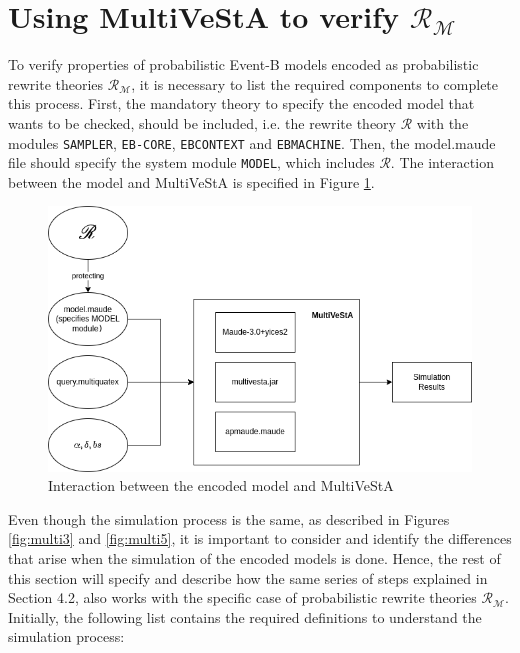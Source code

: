 \section{Using MultiVeStA to verify $\mathscr{R}_\mathscr{M}$}

To verify properties of probabilistic Event-B models encoded as probabilistic rewrite theories $\mathscr{R}_\mathscr{M}$, it is necessary to list the required components to complete this process. First, the mandatory theory to specify the encoded model that wants to be checked, should be included, i.e. the rewrite theory $\mathscr{R}$ with the modules \texttt{SAMPLER}, \texttt{EB-CORE}, \texttt{EBCONTEXT} and \texttt{EBMACHINE}. Then, the model.maude file should specify the system module \texttt{MODEL}, which includes $\mathscr{R}$. The interaction between the model and MultiVeStA is specified in Figure \ref{fig:multi6}.       
\begin{figure}[H]
    \centering
    \includegraphics[scale = 0.5]{images/multi6.png}
    \caption{Interaction between the encoded model and MultiVeStA}
    \label{fig:multi6}
\end{figure}
Even though the simulation process is the same, as described in Figures \ref{fig:multi3} and \ref{fig:multi5}, it is important to consider and identify the differences that arise when the simulation of the encoded models is done. Hence, the rest of this section will specify and describe how the same series of steps explained in Section 4.2, also works with the specific case of probabilistic rewrite theories $\mathscr{R}_\mathscr{M}$. Initially, the following list contains the required definitions to understand the simulation process:
